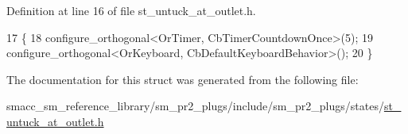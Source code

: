 Definition at line 16 of file st\+\_\+untuck\+\_\+at\+\_\+outlet.\+h.


\begin{DoxyCode}
17     \{
18         configure\_orthogonal<OrTimer,  CbTimerCountdownOnce>(5);    
19         configure\_orthogonal<OrKeyboard, CbDefaultKeyboardBehavior>();
20     \}
\end{DoxyCode}


The documentation for this struct was generated from the following file\+:\begin{DoxyCompactItemize}
\item 
smacc\+\_\+sm\+\_\+reference\+\_\+library/sm\+\_\+pr2\+\_\+plugs/include/sm\+\_\+pr2\+\_\+plugs/states/\hyperlink{st__untuck__at__outlet_8h}{st\+\_\+untuck\+\_\+at\+\_\+outlet.\+h}\end{DoxyCompactItemize}
